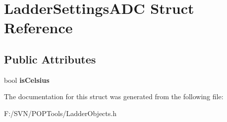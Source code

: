 \hypertarget{struct_ladder_settings_a_d_c}{\section{Ladder\-Settings\-A\-D\-C Struct Reference}
\label{struct_ladder_settings_a_d_c}
}
\subsection*{Public Attributes}
\begin{DoxyCompactItemize}
\item 
\hypertarget{struct_ladder_settings_a_d_c_a27a247a54b414a0d46e92d0d51fb8571}{bool {\bfseries is\-Celsius}}\label{struct_ladder_settings_a_d_c_a27a247a54b414a0d46e92d0d51fb8571}

\end{DoxyCompactItemize}


The documentation for this struct was generated from the following file\-:\begin{DoxyCompactItemize}
\item 
F\-:/\-S\-V\-N/\-P\-O\-P\-Tools/Ladder\-Objects.\-h\end{DoxyCompactItemize}
